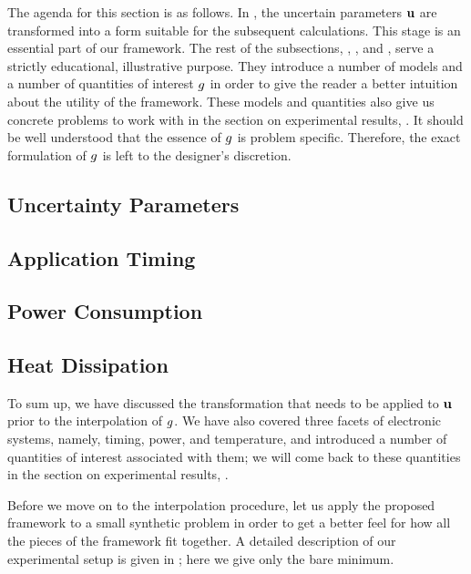 The agenda for this section is as follows. In , the uncertain
parameters $\mathbf{u}$ are transformed into a form suitable for the subsequent
calculations. This stage is an essential part of our framework. The rest of the
subsections, , , and , serve a strictly
educational, illustrative purpose. They introduce a number of models and a
number of quantities of interest $g$ in order to give the reader a better
intuition about the utility of the framework. These models and quantities also
give us concrete problems to work with in the section on experimental results,
. It should be well understood that the essence of $g$ is
problem specific. Therefore, the exact formulation of $g$ is left to the
designer's discretion.

\subsection{Uncertainty Parameters} 



\subsection{Application Timing} 


\subsection{Power Consumption} 


\subsection{Heat Dissipation} 


To sum up, we have discussed the transformation that needs to be applied to
$\mathbf{u}$ prior to the interpolation of $g$. We have also covered three facets of
electronic systems, namely, timing, power, and temperature, and introduced a
number of quantities of interest associated with them; we will come back to
these quantities in the section on experimental results, .

Before we move on to the interpolation procedure, let us apply the proposed
framework to a small synthetic problem in order to get a better feel for how all
the pieces of the framework fit together. A detailed description of our
experimental setup is given in ; here we give only the bare
minimum.

